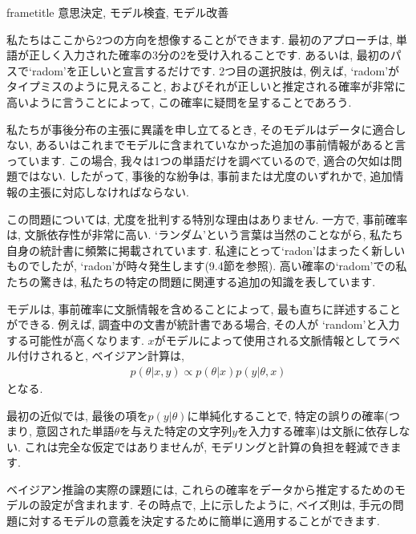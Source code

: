 \documentclass[10pt,dvipdfmx,a4]{beamer}
\newcommand{\eqn}[1]{\begin{align*}#1\end{align*}}
\newcommand{\dbox}[1]{\begin{beamercolorbox}[wd=122mm, sep=0pt, shadow=false, rounded=false]{frametitle} { #1}\end{beamercolorbox}}
\begin{document}
\begin{frame}
\dbox{意思決定, モデル検査, モデル改善}

私たちはここから2つの方向を想像することができます.
最初のアプローチは, 単語が正しく入力された確率の3分の2を受け入れることです.
あるいは, 最初のパスで`radom'を正しいと宣言するだけです.
2つ目の選択肢は, 例えば, `radom'がタイプミスのように見えること, およびそれが正しいと推定される確率が非常に高いように言うことによって, この確率に疑問を呈することであろう.

私たちが事後分布の主張に異議を申し立てるとき, そのモデルはデータに適合しない, あるいはこれまでモデルに含まれていなかった追加の事前情報があると言っています.
この場合, 我々は1つの単語だけを調べているので, 適合の欠如は問題ではない.
したがって, 事後的な紛争は, 事前または尤度のいずれかで, 追加情報の主張に対応しなければならない.

この問題については, 尤度を批判する特別な理由はありません.
一方で, 事前確率は, 文脈依存性が非常に高い.
`ランダム'という言葉は当然のことながら, 私たち自身の統計書に頻繁に掲載されています.
私達にとって`radon'はまったく新しいものでしたが, `radon'が時々発生します(9.4節を参照).
高い確率の`radom'での私たちの驚きは, 私たちの特定の問題に関連する追加の知識を表しています.
\end{frame}


\begin{frame}
モデルは, 事前確率に文脈情報を含めることによって, 最も直ちに詳述することができる.
例えば, 調査中の文書が統計書である場合, その人が `random'と入力する可能性が高くなります.
$x$がモデルによって使用される文脈情報としてラベル付けされると, ベイジアン計算は, 
\eqn{p(\theta|x,y)\propto p(\theta|x)p(y|\theta, x)}
となる.

最初の近似では, 最後の項を$p(y|\theta)$に単純化することで, 特定の誤りの確率(つまり, 意図された単語$\theta$を与えた特定の文字列$y$を入力する確率)は文脈に依存しない.
これは完全な仮定ではありませんが, モデリングと計算の負担を軽減できます.

ベイジアン推論の実際の課題には, これらの確率をデータから推定するためのモデルの設定が含まれます.
その時点で, 上に示したように, ベイズ則は, 手元の問題に対するモデルの意義を決定するために簡単に適用することができます.
\end{frame}

\end{document}
